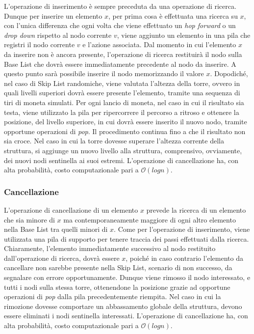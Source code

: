 			L'operazione di inserimento è sempre preceduta da una operazione di ricerca. Dunque per inserire un elemento $ x $, per prima cosa è effettuata una ricerca su $ x $, con l'unica differenza che ogni volta che viene effettuato un \textit{hop forward} o un \textit{drop down} rispetto al nodo corrente $ v $, viene aggiunto un elemento in una pila che registri il nodo corrente $ v $ e l'azione associata.
			Dal momento in cui l'elemento $ x $ da inserire non è ancora presente, l'operazione di ricerca restituirà il nodo sulla Base List che dovrà essere immediatamente precedente al nodo da inserire. A questo punto sarà possibile inserire il nodo memorizzando il valore $ x $. Dopodiché, nel caso di Skip List randomiche, viene valutata l'altezza della torre, ovvero in quali livelli superiori dovrà essere presente l'elemento, tramite una sequenza di tiri di moneta simulati. Per ogni lancio di moneta, nel caso in cui il risultato sia testa, viene utilizzato la pila per ripercorrere il percorso a ritroso e ottenere la posizione, del livello superiore, in cui dovrà essere inserito il nuovo nodo, tramite opportune operazioni di \textit{pop}. Il procedimento continua fino a che il risultato non sia croce. Nel caso in cui la torre dovesse superare l'altezza corrente della struttura, si aggiunge un nuovo livello alla struttura, comprensivo, ovviamente, dei nuovi nodi sentinella ai suoi estremi.
			L'operazione di cancellazione ha, con alta probabilità, costo computazionale pari a $\mathcal{O}(log{}n)$.
		
		\subsubsection{Cancellazione}
		
			L'operazione di cancellazione di un elemento $ x $ prevede la ricerca di un elemento che sia minore di $ x $ ma contemporaneamente maggiore di ogni altro elemento nella Base List tra quelli minori di $ x $. Come per l'operazione di inserimento, viene utilizzata una pila di supporto per tenere traccia dei passi effettuati dalla ricerca. Chiaramente, l'elemento immediatamente successivo al nodo restituito dall'operazione di ricerca, dovrà essere $ x $, poiché in caso contrario l'elemento da cancellare non sarebbe presente nella Skip List, scenario di non successo, da segnalare con errore opportunamente.
			Dunque viene rimosso il nodo interessato, e tutti i nodi sulla stessa torre, ottenendone la posizione grazie ad opportune operazioni di \textit{pop} dalla pila precedentemente riempita.
			Nel caso in cui la rimozione dovesse comportare un abbassamento globale della struttura, devono essere eliminati i nodi sentinella interessati.
			L'operazione di cancellazione ha, con alta probabilità, costo computazionale pari a $\mathcal{O}(log{}n)$.
			
